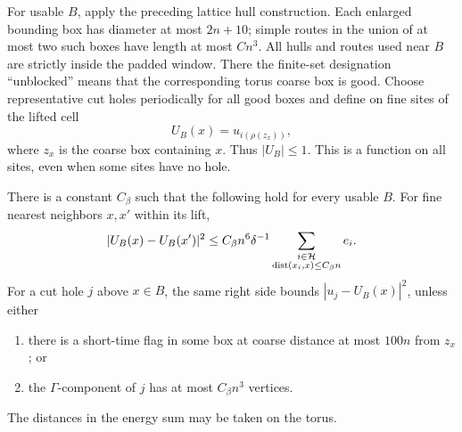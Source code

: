 For usable $B$, apply the preceding lattice hull construction.
Each enlarged bounding box has diameter at most $2n+10$; simple
routes in the union of at most two such boxes have length at most
$Cn^3$.  All hulls and routes used near $B$ are strictly inside the
padded window.  There the finite-set designation ``unblocked''
means that the corresponding torus coarse box is good.  Choose
representative cut holes periodically for all good boxes and define
on fine sites of the lifted cell
\begin{equation}\label{eq:comparison-function}
 U_B(x)=u_{i(\rho(z_x))},
\end{equation}
where $z_x$ is the coarse box containing $x$.  Thus $|U_B|\le1$.
This is a function on all sites, even when some sites have no hole.

\begin{lemma}
\label{lem:hull-comparison}
There is a constant $C_\beta$ such that the following hold for
every usable $B$.
For fine nearest neighbors $x,x'$ within its lift,
\begin{equation}\label{eq:comparison-edge}
 |U_B(x)-U_B(x')|^2
 \le C_\beta n^6\delta^{-1}
       \sum_{\substack{i\in\mathcal H\\
               \operatorname{dist}(x_i,x)\le C_\beta n}} e_i.
\end{equation}
For a cut hole $j$ above $x\in B$, the same right side bounds
$|u_j-U_B(x)|^2$, unless either
\begin{enumerate}[label=(\roman*),nosep]
 \item there is a short-time flag in some box at coarse distance
 at most $100n$ from $z_x$; or
 \item the $\Gamma$-component of $j$ has at most $C_\beta n^3$
 vertices.
\end{enumerate}
The distances in the energy sum may be taken on the torus.
\end{lemma}

